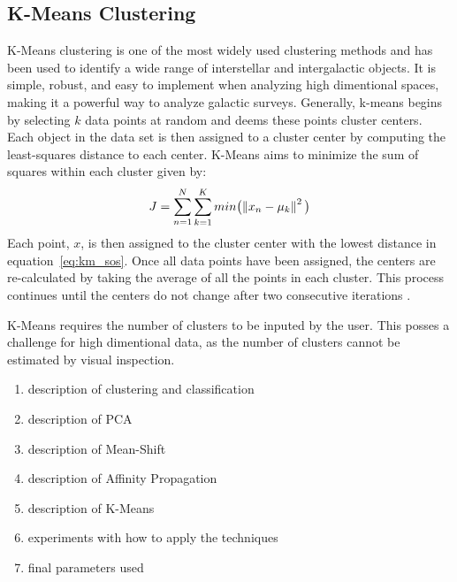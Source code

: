 \subsection{K-Means Clustering}
K-Means clustering is one of the most widely used clustering methods and has been used to identify a wide range of interstellar and intergalactic objects. %
It is simple, robust, and easy to implement when analyzing high dimentional spaces, making it a powerful way to analyze galactic surveys. 
Generally, k-means begins by selecting $k$ data points at random and deems these points cluster centers. 
Each object in the data set is then assigned to a cluster center by computing the least-squares distance to each center.
K-Means aims to minimize the sum of squares within each cluster given by:
\begin{equation} 
\label{eq:km_sos}
J = \sum_{n=1}^N \sum_{k=1}^K min \big( \norm{x_n - \mu_k}^2 \big)
\end{equation}
Each point, $x$, is then assigned to the cluster center with the lowest distance in equation~\ref{eq:km_sos}\citet{tammour16}.
Once all data points have been assigned, the centers are re-calculated by taking the average of all the points in each cluster. 
This process continues until the centers do not change after two consecutive iterations \citet{sanchez-almeida13}. 

K-Means requires the number of clusters to be inputed by the user. 
This posses a challenge for high dimentional data, as the number of clusters cannot be estimated by visual inspection. 





\begin{enumerate}
\item description of clustering and classification 
\item description of PCA
\item description of Mean-Shift
\item description of Affinity Propagation
\item description of K-Means
\item experiments with how to apply the techniques
\item final parameters used
\end{enumerate}
